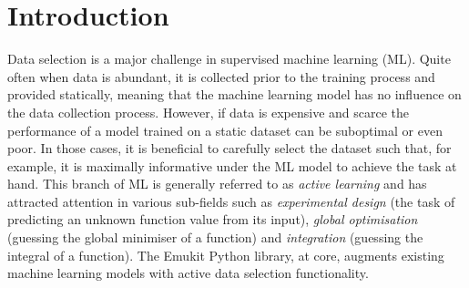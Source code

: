 \newcommand{\maren}[1]{{\color{cyan} \textbf{[Maren: #1]}}}
\newcommand{\andrei}[1]{{\color{red} \textbf{[Andrei: #1]}}}
\newcommand{\rev}[1]{{\color{blue} \textbf{#1}}}

\section{Introduction}\label{introduction}


Data selection is a major challenge in supervised machine learning (ML). Quite often when data is abundant, it is collected prior to the training process and provided statically, meaning that the machine learning model has no influence on the data collection process. However, if data is expensive and scarce the performance of a model trained on a static dataset can be suboptimal or even poor. In those cases, it is beneficial to carefully select the dataset such that, for example, it is maximally informative under the ML model to achieve the task at hand. This branch of ML is generally referred to as \emph{active learning} \cite{Settles2009} and has attracted attention in various sub-fields such as \emph{experimental design} (the task of predicting an unknown function value from its input), \emph{global optimisation} (guessing the global minimiser of a function) and \emph{integration} (guessing the integral of a function).
The Emukit Python library, at core, augments existing machine learning models with active data selection functionality.


